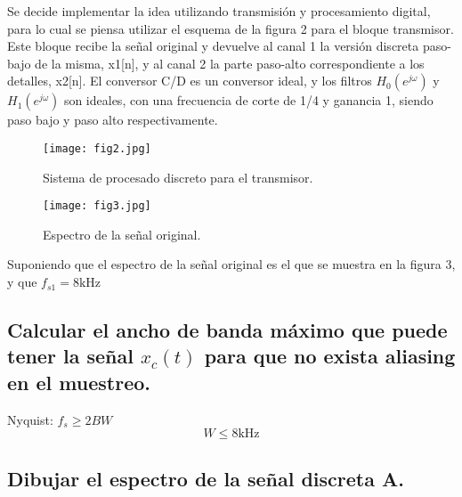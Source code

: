 \documentclass{article}
\begin{document}
\begin{flushleft}
	Se decide implementar la idea utilizando transmisión y procesamiento digital, para lo cual se piensa utilizar el esquema de la figura 2 para el bloque transmisor. Este bloque recibe la señal original y devuelve al canal 1 la versión discreta paso-bajo de la misma, x1[n], y al canal 2 la parte paso-alto correspondiente a los detalles, x2[n]. El conversor C/D es un conversor ideal, y los filtros $H_0(e^{j \omega})$ y $H_1(e^{j \omega})$ son ideales, con una frecuencia de corte de 1/4 y ganancia 1, siendo paso bajo y paso alto respectivamente.
\end{flushleft}
\newpage

\begin{figure}[h!]
    \centering
    \texttt{[image: fig2.jpg]} 
    \caption{Sistema de procesado discreto para el transmisor.}
    \label{fig2:ejemplo2}
\end{figure}

\begin{figure}[h!]
    \centering
    \texttt{[image: fig3.jpg]} 
    \caption{Espectro de la señal original.}
    \label{fig3:ejemplo3}
\end{figure}

\begin{flushleft}
    Suponiendo que el espectro de la señal original es el que se muestra en la figura 3, y que $f_{s1} = 8 \text{kHz}$
\end{flushleft}

\subsection{Calcular el ancho de banda máximo que puede tener la señal $x_{c}(t)$ para que no exista aliasing en el muestreo.}
Nyquist: $f_{s} \geq 2BW$
$$
W \leq 8 \text{kHz}
$$
\subsection{Dibujar el espectro de la señal discreta A.}

\begin{figure}[h!]
    \centering
\end{figure}
\end{document}

